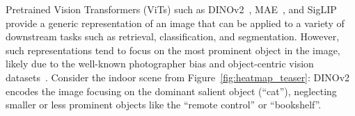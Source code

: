 Pretrained Vision Transformers (ViTs) such as DINOv2~\cite{dinov2}, MAE~\cite{he2022mae}, and SigLIP~\cite{zhai2023_siglip} provide a generic representation of an image that can be applied to a variety of downstream tasks such as retrieval, classification, and segmentation.
However, such representations tend to focus on the most prominent object in the image, likely due to the well-known photographer bias and object-centric vision datasets~\cite{torralba2011unbiased}.
Consider the indoor scene from Figure~\ref{fig:heatmap_teaser}: DINOv2 encodes the image focusing on the dominant salient object (``cat''), neglecting smaller or less prominent objects
like the ``remote control'' or ``bookshelf''.

